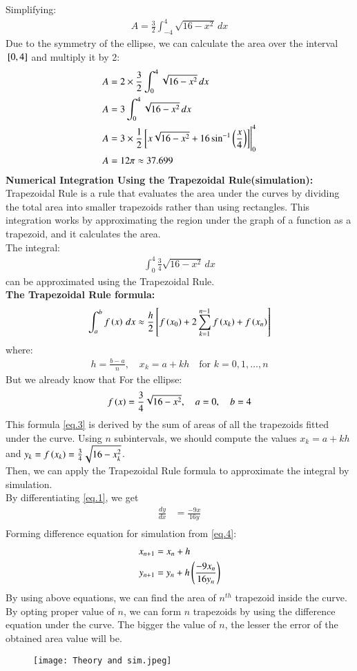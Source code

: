 \documentclass[journal,12pt,onecolumn]{IEEEtran}
\theoremstyle{remark}
\begin{document}
Simplifying:
\begin{align}
A = \frac{3}{2} \int_{-4}^{4} \sqrt{16 - x^2} \, dx
\end{align}
Due to the symmetry of the ellipse, we can calculate the area over the interval ${}\left[0,4\right]$ and multiply it by 2:
\begin{align}
A &= 2 \times \frac{3}{2} \int_{0}^{4} \sqrt{16 - x^2} \, dx\\
A &= 3 \int_{0}^{4} \sqrt{16 - x^2} \, dx\\
A &= 3\times\frac{1}{2}{}\left[x\sqrt{16-x^2}+16\sin^{-1}\left(\frac{x}{4}\right)  \right]\Biggr|_{0}^{4}\\
A &= 12\pi \approx 37.699
\end{align}
\textbf{Numerical Integration Using the Trapezoidal Rule(simulation):}\\
Trapezoidal Rule is a rule that evaluates the area under the curves by dividing the total area into smaller trapezoids rather than using rectangles. This integration works by approximating the region under the graph of a function as a trapezoid, and it calculates the area.\\
The integral:
\begin{align}
\int_{0}^{4} \frac{3}{4}\sqrt{16 - x^2} \, dx
\end{align}
can be approximated using the Trapezoidal Rule.\\
\textbf{The Trapezoidal Rule formula:}
\begin{align}
\int_a^b f\left(x\right) \, dx \approx \frac{h}{2} {}\left[ f\left(x_0\right) + 2 \sum_{k=1}^{n-1} f\left(x_k\right) + f\left(x_n\right) \right]\label{eq.3}
\end{align}
where:
\begin{align}
h = \frac{b - a}{n}, \quad x_k = a + k h \quad \text{for } k = 0, 1, \dots, n
\end{align}
But we already know that
For the ellipse:
\begin{align}
f\left(x\right) = \frac{3}{4}\sqrt{16 - x^2}, \quad a = 0, \quad b = 4
\end{align}
This formula \ref{eq.3} is derived by the sum of areas of all the trapezoids fitted under the curve.
Using $n$ subintervals, we should compute the values $ x_k = a + kh $ and $ y_k=f\left(x_k\right) = \frac{3}{4}\sqrt{16 - x_k^2} $.\\ Then, we can apply the Trapezoidal Rule formula to approximate the integral by simulation.\\
By differentiating \ref{eq.1}, we get
\begin{align}
    \frac{dy}{dx}&=\frac{-9x}{16y} \label{eq.4}\\
\end{align}
Forming difference equation for simulation from \ref{eq.4}:
\begin{align}
x_{n+1}&=x_n+h\\
    y_{n+1}&=y_n+h\left(\frac{-9x_n}{16y_n}\right)\\
\end{align}
By using above equations, we can find the area of $n^{th}$ trapezoid inside the curve.
By opting proper value of $n$, we can form $n$ trapezoids by using the difference equation under the curve. The bigger the value of $n$, the lesser the error of the obtained area value will be.
  

\begin{figure}[htbp] 
    \centering %
    \texttt{[image: Theory and sim.jpeg]} 
    \label{fig:example} %
\end{figure}


   
\end{document}
